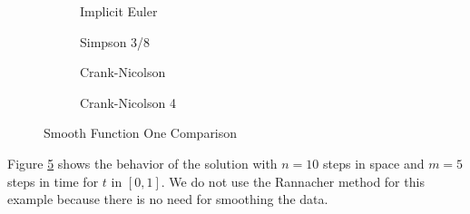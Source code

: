 \documentclass[00main.tex]{subfiles}
\begin{document}


\begin{figure}
\centering
\begin{subfigure}[b]{0.3\textwidth}
\resizebox{1\textwidth}{!}{
}
\caption{Implicit Euler}
\label{euler01}
\end{subfigure}%
\begin{subfigure}[b]{0.3\textwidth}
\resizebox{1\textwidth}{!}{
}
\caption{Simpson 3/8}
\label{fig:tiger}
\end{subfigure}

\begin{subfigure}[b]{0.3\textwidth}
\resizebox{1\textwidth}{!}{
}
\caption{Crank-Nicolson}
\label{fig:mouse}
\end{subfigure}
\begin{subfigure}[b]{0.3\textwidth}
\resizebox{1\textwidth}{!}{
}
\caption{\centering Crank-Nicolson 4}
\label{fig:mouse}
\end{subfigure}
\caption{Smooth Function One Comparison}\label{fig_smooth2}
\end{figure}

Figure \ref{fig_smooth2} shows the behavior of the solution with $n= 10$ steps in space and $m=5$ steps in time for $t$ in $[0,1]$. We do not use the Rannacher method for this example because there is no need for smoothing the data. %
\end{document}
